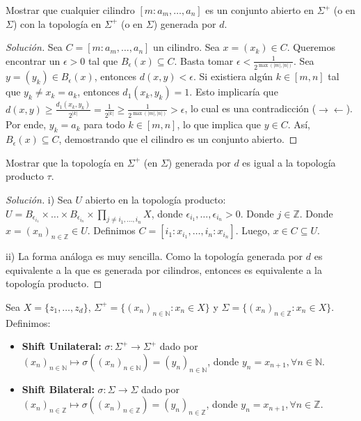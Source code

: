 \begin{ejercicio}
	Mostrar que cualquier cilindro $[m: a_m, \dots, a_n]$ es un conjunto abierto en $\Sigma^+$ (o en $\Sigma$) con la topología en $\Sigma^+$ (o en $\Sigma$) generada por $d$.
\end{ejercicio}
\begin{proof}[Solución]
	Sea $C = [m: a_m, \dots, a_n]$ un cilindro. Sea $x = (x_k) \in C$. 
	Queremos encontrar un $\epsilon > 0$ tal que $B_\epsilon(x) \subseteq C$. 
	Basta tomar $\epsilon < \frac{1}{2^{\max(|m|, |n|)}}$. Sea $y = (y_k) \in B_\epsilon(x)$, entonces $d(x, y) < \epsilon$.
	Si existiera algún $k \in [m, n]$ tal que $y_k \neq x_k = a_k$, entonces $d_1(x_k, y_k) = 1$.
	Esto implicaría que $d(x, y) \ge \frac{d_1(x_k, y_k)}{2^{|k|}} = \frac{1}{2^{|k|}} \ge \frac{1}{2^{\max(|m|, |n|)}} > \epsilon$, lo cual es una contradicción ($\rightarrow \leftarrow$).
	Por ende, $y_k = a_k$ para todo $k \in [m, n]$, lo que implica que $y \in C$. Así, $B_\epsilon(x) \subseteq C$, demostrando que el cilindro es un conjunto abierto.
\end{proof}

\begin{ejercicio}
	Mostrar que la topología en $\Sigma^+$ (en $\Sigma$) generada por $d$ es igual a la topología producto $\tau$.
\end{ejercicio}
\begin{proof}[Solución]
	i) Sea $U$ abierto en la topología producto: $U = B_{\epsilon_{i_1}} \times \dots \times B_{\epsilon_{i_n}} \times \prod_{j \neq i_1,\dots,i_n} X$, donde $\epsilon_{i_1}, \dots, \epsilon_{i_n} > 0$. Donde $j \in \mathbb{Z}$.
	Donde $x = (x_n)_{n \in \mathbb{Z}} \in U$. Definimos $C = [i_1: x_{i_1}, \dots, i_n: x_{i_n}]$. Luego, $x \in C \subseteq U$.
	
	ii) La forma análoga es muy sencilla. 
	Como la topología generada por $d$ es equivalente a la que es generada por cilindros, entonces es equivalente a la topología producto.
\end{proof}

\begin{definicion}
	Sea $X = \{z_1, \dots, z_d\}$, $\Sigma^+ = \{(x_n)_{n \in \mathbb{N}} : x_n \in X\}$ y $\Sigma = \{(x_n)_{n \in \mathbb{Z}} : x_n \in X\}$. Definimos:
	\begin{itemize}
		\item \textbf{Shift Unilateral:} $\sigma: \Sigma^+ \to \Sigma^+$ dado por $(x_n)_{n \in \mathbb{N}} \mapsto \sigma((x_n)_{n \in \mathbb{N}}) = (y_n)_{n \in \mathbb{N}}$, donde $y_n = x_{n+1}, \forall n \in \mathbb{N}$.
		\item \textbf{Shift Bilateral:} $\sigma: \Sigma \to \Sigma$ dado por $(x_n)_{n \in \mathbb{Z}} \mapsto \sigma((x_n)_{n \in \mathbb{Z}}) = (y_n)_{n \in \mathbb{Z}}$, donde $y_n = x_{n+1}, \forall n \in \mathbb{Z}$.
	\end{itemize}
\end{definicion}

